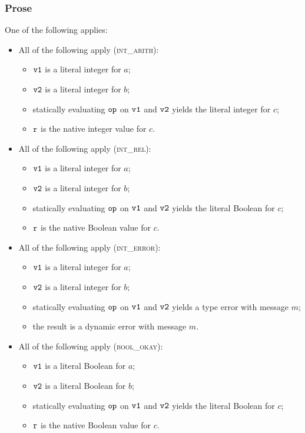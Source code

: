 \subsubsection{Prose}
One of the following applies:
\begin{itemize}
  \item All of the following apply (\textsc{int\_arith}):
  \begin{itemize}
    \item $\texttt{v1}$ is a literal integer for $a$;
    \item $\texttt{v2}$ is a literal integer for $b$;
    \item statically evaluating $\texttt{op}$ on $\texttt{v1}$ and $\texttt{v2}$ yields the literal integer for $c$;
    \item $\texttt{r}$ is the native integer value for $c$.
  \end{itemize}

  \item All of the following apply (\textsc{int\_rel}):
  \begin{itemize}
    \item $\texttt{v1}$ is a literal integer for $a$;
    \item $\texttt{v2}$ is a literal integer for $b$;
    \item statically evaluating $\texttt{op}$ on $\texttt{v1}$ and $\texttt{v2}$ yields the literal Boolean for $c$;
    \item $\texttt{r}$ is the native Boolean value for $c$.
  \end{itemize}

  \item All of the following apply (\textsc{int\_error}):
  \begin{itemize}
    \item $\texttt{v1}$ is a literal integer for $a$;
    \item $\texttt{v2}$ is a literal integer for $b$;
    \item statically evaluating $\texttt{op}$ on $\texttt{v1}$ and $\texttt{v2}$ yields a type error with message $m$;
    \item the result is a dynamic error with message $m$.
  \end{itemize}

  \item All of the following apply (\textsc{bool\_okay}):
  \begin{itemize}
    \item $\texttt{v1}$ is a literal Boolean for $a$;
    \item $\texttt{v2}$ is a literal Boolean for $b$;
    \item statically evaluating $\texttt{op}$ on $\texttt{v1}$ and $\texttt{v2}$ yields the literal Boolean for $c$;
    \item $\texttt{r}$ is the native Boolean value for $c$.
  \end{itemize}


\end{itemize}
